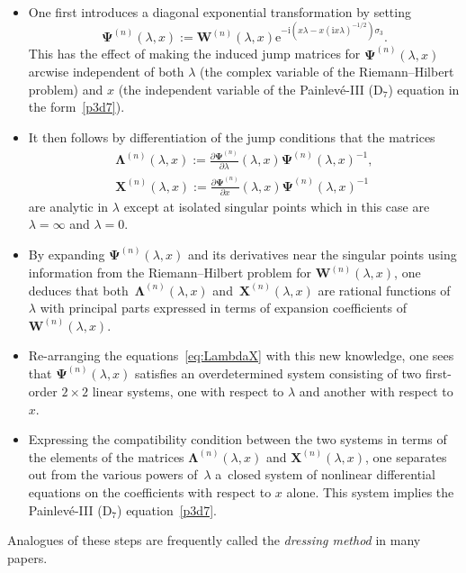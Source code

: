\documentclass[pdftex]{sigma}
\numberwithin{equation}{section}
\begin{document}
\begin{itemize}\itemsep=0pt
\item One first introduces a diagonal exponential transformation by setting
\begin{equation*}
\boldsymbol{\Psi}^{(n)}(\lambda,x):=\mathbf{W}^{(n)}(\lambda,x)\mathrm{e}^{-\mathrm{i} (x\lambda-x(\mathrm{i} x\lambda)^{-1/2})\sigma_3}.
\end{equation*}
This has the effect of making the induced jump matrices for $\boldsymbol{\Psi}^{(n)}(\lambda,x)$ arcwise independent of both $\lambda$ (the complex variable of the Riemann--Hilbert problem) and $x$ (the independent variable of the Painlev\'e-III (D$_7$) equation in the form~\eqref{p3d7}).
\item It then follows by differentiation of the jump conditions that the matrices
\begin{gather}
\boldsymbol{\Lambda}^{(n)}(\lambda,x):=\frac{\partial\boldsymbol{\Psi}^{(n)}}{\partial\lambda}(\lambda,x)\boldsymbol{\Psi}^{(n)}(\lambda,x)^{-1},\nonumber\\
 \mathbf{X}^{(n)}(\lambda,x):=\frac{\partial\boldsymbol{\Psi}^{(n)}}{\partial x}(\lambda,x)\boldsymbol{\Psi}^{(n)}(\lambda,x)^{-1}
 \label{eq:LambdaX}
 \end{gather}
are analytic in $\lambda$ except at isolated singular points which in this case are $\lambda=\infty$ and $\lambda=0$.
\item By expanding $\boldsymbol{\Psi}^{(n)}(\lambda,x)$ and its derivatives near the singular points using information from the Riemann--Hilbert problem for $\mathbf{W}^{(n)}(\lambda,x)$, one deduces that both~$\boldsymbol{\Lambda}^{(n)}(\lambda,x)$ and~$\mathbf{X}^{(n)}(\lambda,x)$ are rational functions of $\lambda$ with principal parts expressed in terms of expansion coefficients of $\mathbf{W}^{(n)}(\lambda,x)$.
\item Re-arranging the equations~\eqref{eq:LambdaX} with this new knowledge, one sees that $\boldsymbol{\Psi}^{(n)}(\lambda,x)$ satisfies an overdetermined system consisting of two first-order $2\times 2$ linear systems, one with respect to $\lambda$ and another with respect to $x$.
\item Expressing the compatibility condition between the two systems in terms of the elements of the matrices $\boldsymbol{\Lambda}^{(n)}(\lambda,x)$ and $\mathbf{X}^{(n)}(\lambda,x)$, one separates out from the various powers of~$\lambda$ a~closed system of nonlinear differential equations on the coefficients with respect to $x$ alone. This system implies the Painlev\'e-III (D$_7$) equation~\eqref{p3d7}.
\end{itemize}
Analogues of these steps are frequently called the \emph{dressing method} in many papers.
\end{document}
